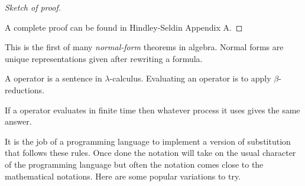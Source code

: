 \begin{proof}[Sketch of proof]
\begin{center}
\end{center}


A complete proof can be found in Hindley-Seldin Appendix A.
\end{proof}

This is the first of many \emph{normal-form} theorems in algebra.
Normal forms are unique representations given after rewriting a formula.


\begin{definition}
    A operator is a sentence in $\lambda$-calculus.
    Evaluating an operator is to apply $\beta$-reductions.
\end{definition}

\begin{corollary}
    If a operator evaluates in finite time then whatever process it uses 
    gives the same answer.
\end{corollary}



It is the job of a programming language to implement a version 
of substitution that follows these rules.  Once done the notation will take 
on the usual character of the programming language but often the notation 
comes close to the mathematical notations.  Here are some popular variations to try.
\begin{center}
    \hspace{1cm}
    \hspace{1cm}
    \\
    \hspace{1cm}
\end{center} 


